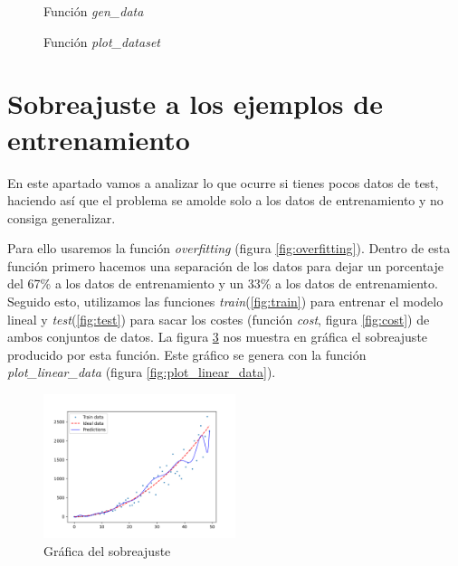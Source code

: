 \documentclass[6pt]{../../shared/AiTex}
\begin{document}
\begin{figure}[H]
    \centering
    
    \caption{Función \textit{gen\_data}}
    \label{fig:gen_data}
\end{figure}

\begin{figure}[H]
    \centering
    
    \caption{Función \textit{plot\_dataset}}
    \label{fig:plot_dataset}
\end{figure}

\section{Sobreajuste a los ejemplos de entrenamiento}

En este apartado vamos a analizar lo que ocurre si tienes pocos datos de test, haciendo así que el problema se amolde solo a los datos de entrenamiento y no consiga generalizar.

Para ello usaremos la función \textit{overfitting} (figura \ref{fig:overfitting}). Dentro de esta función primero hacemos una separación de los datos para dejar un porcentaje del 67\% a los datos de entrenamiento y un 33\% a los datos de entrenamiento. Seguido esto, utilizamos las funciones \textit{train}(\ref{fig:train}) para entrenar el modelo lineal y \textit{test}(\ref{fig:test}) para sacar los costes (función \textit{cost}, figura \ref{fig:cost}) de ambos conjuntos de datos. La figura \ref{fig:overfitting_plot} nos muestra en gráfica el sobreajuste producido por esta función. Este gráfico se genera con la función \textit{plot\_linear\_data} (figura \ref{fig:plot_linear_data}).

\begin{figure}[H]
    \centering
    \includegraphics[width=0.5\textwidth]{./images/overfitting.png}
    \caption{Gráfica del sobreajuste}
    \label{fig:overfitting_plot}
\end{figure}
\end{document}
